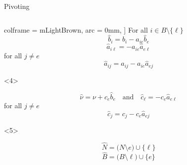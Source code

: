 \documentclass[32pt, aspectratio = 169]{beamer}
\begin{document}
\begin{frame}{Pivoting}
\begin{columns}
\begin{column}{.5\textwidth}
\begin{overlayarea}{.8\textwidth}{.5\textheight}
\begin{onlyenv}
\begin{tcolorbox}
                    colframe = mLightBrown,
                    arc = 0mm,
                    ]
                For all $i \in B \setminus \{\ell\}$
                \[
               \widehat{b}_i = b_i - a_{ie}\widehat{b}_e
                \]
                \[
                \widehat{a}_{i\ell} = -a_{ie}\widehat{a}_{e\ell}
                \]
                for all $j \neq e$
                \[
                \widehat{a}_{ij}  = a_{ij} - a_{ie}\widehat{a}_{ej}
                \]
                \end{tcolorbox}
            \end{onlyenv}
            \begin{onlyenv}<4>
                \begin{tcolorbox}[
                    enhanced,
                    parbox = false,
                    colback = mLightBrown!10!white,
                    colframe = mLightBrown,
                    arc = 0mm,
                    ]
                \[
                \widehat{\nu} = \nu + c_e\widehat{b}_e \quad  \text{and}\quad \widehat{c}_{\ell} = -c_e\widehat{a}_{e\ell}
                \]
                for all $j \neq e$
                \[
                \widehat{c}_{j}  = c_j - c_e\widehat{a}_{ej}
                \]
            \end{tcolorbox}
            \end{onlyenv}
            \begin{onlyenv}<5>
                \begin{tcolorbox}[
                    enhanced,
                    parbox = false,
                    colback = mLightBrown!10!white,
                    colframe = mLightBrown,
                    arc = 0mm,
                    ]
                \[
                    \widehat{N}  = \big(N \setminus e \big) \cup \{\ell\}
                \]
                \[
                    \widehat{B}  = \big(B \setminus \ell \big) \cup \{e\}
                \]
            \end{tcolorbox}
            \end{onlyenv}
        \end{overlayarea}
        \end{column}
    \end{columns}
\end{frame}
\end{document}
